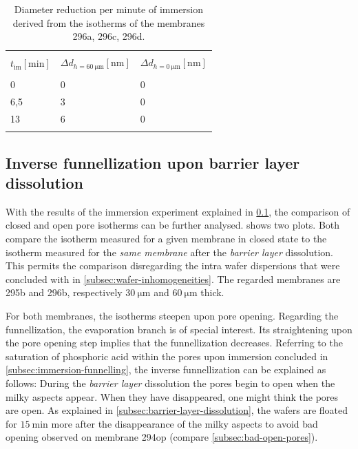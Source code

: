 \documentclass[../thesis.tex]{subfiles}
\begin{document}
          \begin{table}[tb]
           \caption{Diameter reduction per minute of immersion derived from the isotherms of the membranes 296a, 296c, 296d.}
           \label{tbl:etch-rate}
           \begin{tabu} {X[r]X[r]X[r]}
             \unitoprule \\
             \textbf{$t_\mathrm{im} [\si{\minute}]$} & \textbf{$\Delta d_{h=\SI{60}{\micro\meter}} [\si{\nano\meter}]$} & \textbf{$\Delta d_{h=\SI{0}{\micro\meter}} [\si{\nano\meter}]$} \\
             \unimidrule \\
             0 &0  &0 \\
             6,5 &3  &0  \\
             13  &6  &0  \\
             \unitoprule \\
           \end{tabu}
          \end{table}

          


        \subsection{Inverse funnellization upon barrier layer dissolution}
        \label{subsec:inverse-funnelling}

          With the results of the immersion experiment explained in \cref{subsec:inverse-funnelling}, the comparison of closed and open pore isotherms can be further analysed.  shows two plots. Both compare the isotherm measured for a given membrane in closed state to the isotherm measured for the \textit{same membrane} after the \textit{barrier layer} dissolution. This permits the comparison disregarding the intra wafer dispersions that were concluded with in \cref{subsec:wafer-inhomogeneities}. The regarded membranes are 295b and 296b, respectively $\SI{30}{\micro\meter}$ and $\SI{60}{\micro\meter}$ thick.

          

          For both membranes, the isotherms steepen upon pore opening. Regarding the funnellization, the evaporation branch is of special interest. Its straightening upon the pore opening step implies that the funnellization decreases. Referring to the saturation of phosphoric acid within the pores upon immersion concluded in \cref{subsec:immersion-funnelling}, the inverse funnellization can be explained as follows: During the \textit{barrier layer} dissolution the pores begin to open when the milky aspects appear. When they have disappeared, one might think the pores are open. As explained in \cref{subsec:barrier-layer-dissolution}, the wafers are floated for $\SI{15}{\minute}$ more after the disappearance of the milky aspects to avoid bad opening observed on membrane 294op (compare \cref{subsec:bad-open-pores}).
\end{document}
